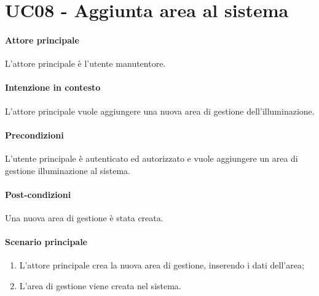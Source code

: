 \section{UC08 - Aggiunta area al sistema}\label{uc:08}

\paragraph{Attore principale} L'attore principale è l'utente manutentore.

\paragraph{Intenzione in contesto} L'attore principale vuole aggiungere una nuova area di gestione dell'illuminazione.


\paragraph{Precondizioni}
L'utente principale è autenticato ed autorizzato e vuole aggiungere un area di gestione illuminazione al sistema.

\paragraph{Post-condizioni}
Una nuova area di gestione è stata creata.

\paragraph{Scenario principale}
\begin{enumerate}
    \item L'attore principale crea la nuova area di gestione, inserendo i dati dell'area;
    \item L'area di gestione viene creata nel sistema.
\end{enumerate}

